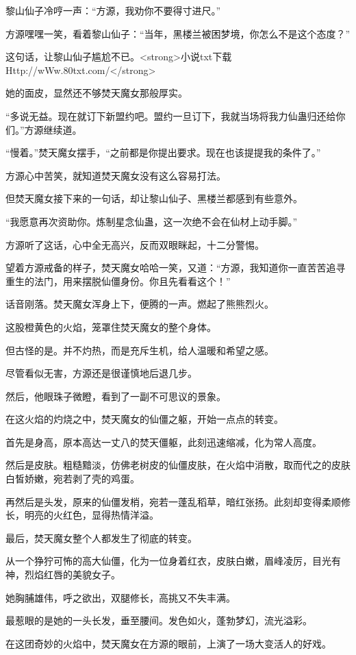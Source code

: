 \begin{this_body}
黎山仙子冷哼一声：“方源，我劝你不要得寸进尺。”

方源嘿嘿一笑，看着黎山仙子：“当年，黑楼兰被困梦境，你怎么不是这个态度？”

这句话，让黎山仙子尴尬不已。<strong>小说txt下载Http://wWw.80txt.com/</strong>

她的面皮，显然还不够焚天魔女那般厚实。

“多说无益。现在就订下新盟约吧。盟约一旦订下，我就当场将我力仙蛊归还给你们。”方源继续道。

“慢着。”焚天魔女摆手，“之前都是你提出要求。现在也该提提我的条件了。”

方源心中苦笑，就知道焚天魔女没有这么容易打法。

但焚天魔女接下来的一句话，却让黎山仙子、黑楼兰都感到有些意外。

“我愿意再次资助你。炼制星念仙蛊，这一次绝不会在仙材上动手脚。”

方源听了这话，心中全无高兴，反而双眼眯起，十二分警惕。

望着方源戒备的样子，焚天魔女哈哈一笑，又道：“方源，我知道你一直苦苦追寻重生的法门，用来摆脱仙僵身份。你且先看看这个！”

话音刚落。焚天魔女浑身上下，便腾的一声。燃起了熊熊烈火。

这股橙黄色的火焰，笼罩住焚天魔女的整个身体。

但古怪的是。并不灼热，而是充斥生机，给人温暖和希望之感。

尽管看似无害，方源还是很谨慎地后退几步。

然后，他眼珠子微瞪，看到了一副不可思议的景象。

在这火焰的灼烧之中，焚天魔女的仙僵之躯，开始一点点的转变。

首先是身高，原本高达一丈八的焚天僵躯，此刻迅速缩减，化为常人高度。

然后是皮肤。粗糙黯淡，仿佛老树皮的仙僵皮肤，在火焰中消散，取而代之的皮肤白皙娇嫩，宛若剥了壳的鸡蛋。

再然后是头发，原来的仙僵发梢，宛若一蓬乱稻草，暗红张扬。此刻却变得柔顺修长，明亮的火红色，显得热情洋溢。

最后，焚天魔女整个人都发生了彻底的转变。

从一个狰狞可怖的高大仙僵，化为一位身着红衣，皮肤白嫩，眉峰凌厉，目光有神，烈焰红唇的美貌女子。

她胸脯雄伟，呼之欲出，双腿修长，高挑又不失丰满。

最惹眼的是她的一头长发，垂至腰间。发色如火，蓬勃梦幻，流光溢彩。

在这团奇妙的火焰中，焚天魔女在方源的眼前，上演了一场大变活人的好戏。


\end{this_body}
